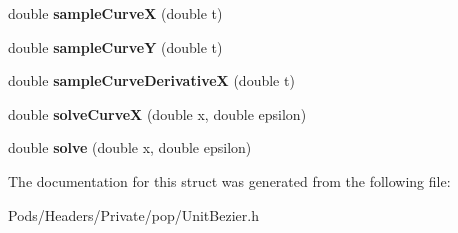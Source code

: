 \begin{DoxyCompactItemize}
double {\bfseries sample\+CurveX} (double t)
\item 
\mbox{\label{struct_web_core_1_1_unit_bezier_a85a17efada3e5a7c51c862d4385dd1d1}} 
double {\bfseries sample\+CurveY} (double t)
\item 
\mbox{\label{struct_web_core_1_1_unit_bezier_aad9b7d2275089d53014ac0773fc51d47}} 
double {\bfseries sample\+Curve\+DerivativeX} (double t)
\item 
\mbox{\label{struct_web_core_1_1_unit_bezier_ae1499ee43da030757b7656e1ef737dd4}} 
double {\bfseries solve\+CurveX} (double x, double epsilon)
\item 
\mbox{\label{struct_web_core_1_1_unit_bezier_a413cc705e81db83326cb67ac4093af4c}} 
double {\bfseries solve} (double x, double epsilon)
\end{DoxyCompactItemize}


The documentation for this struct was generated from the following file\+:\begin{DoxyCompactItemize}
\item 
Pods/\+Headers/\+Private/pop/Unit\+Bezier.\+h\end{DoxyCompactItemize}
